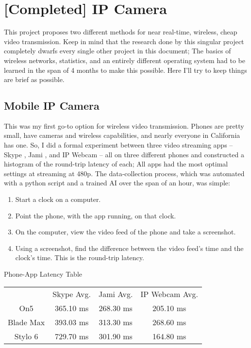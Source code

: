 ﻿\section{[Completed] IP Camera}

This project proposes two different methods for near real-time, wireless, cheap video transmission. Keep in mind that the research done by this singular project completely dwarfs every single other project in this document; The basics of wireless networks, statistics, and an entirely different operating system had to be learned in the span of 4 months to make this possible. Here I'll try to keep things are brief as possible.

\subsection{Mobile IP Camera}

This was my first go-to option for wireless video transmission. Phones are pretty small, have cameras and wireless capabilities, and nearly everyone in California has one. So, I did a formal experiment between three video streaming apps -- Skype \cite{Skype}, Jami \cite{Jami}, and IP Webcam \cite{IPWebcam} -- all on three different phones and constructed a histogram of the round-trip latency of each; All apps had the most optimal settings at streaming at 480p. The data-collection process, which was automated with a python script and a trained AI over the span of an hour, was simple:

\begin{enumerate}
\item{Start a clock on a computer.}
\item{Point the phone, with the app running, on that clock.}
\item{On the computer, view the video feed of the phone and take a screenshot.}
\item{Using a screenshot, find the difference between the video feed's time and the clock's time. This is the round-trip latency. }
\end{enumerate}

\begin{centering}
Phone-App Latency Table\\[0.5cm]

\begin{tabular}{c|c|c|c}
    & Skype Avg. & Jami Avg. & IP Webcam Avg. \\[0.5cm]
    On5 & 365.10 ms & 268.30 ms & 205.10 ms \\[0.5cm]
    Blade Max & 393.03 ms & 313.30 ms & 268.60 ms \\[0.5cm]
    Stylo 6 & 729.70 ms & 301.90 ms & 164.80 ms
\end{tabular} \newline

\end{centering}


